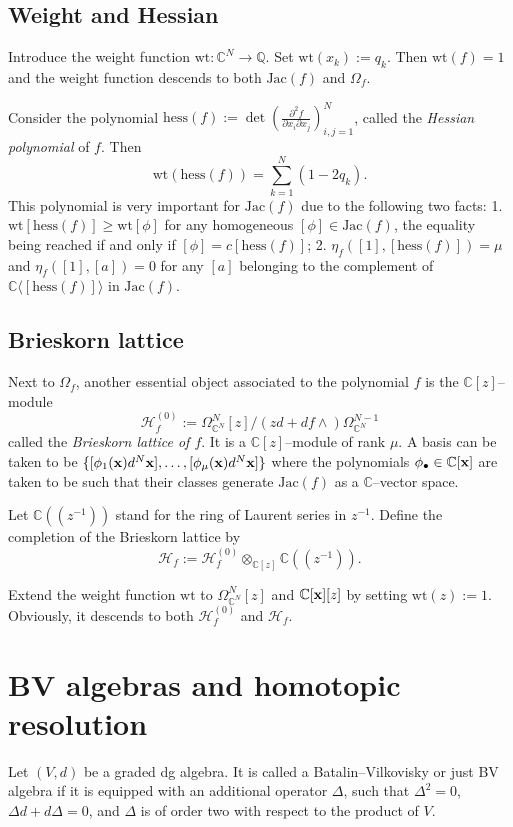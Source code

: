 \documentclass[12pt,a4paper]{amsart}
\newcommand{\CC}{{\mathbb{C}}}
\newcommand{\QQ}{{\mathbb{Q}}}
\newcommand{\Jac}{\mathrm{Jac}}
\newcommand{\bx}{{\bf x}}
\newcommand{\hess}{\mathrm{hess}}
\newcommand{\wt}{\mathrm{wt}}
\def\H{{\mathcal H}}
\newcommand{\p}{{\partial}}
\newcommand{\<}{\left<}
\renewcommand{\>}{\right>}
\newcommand{\ZZ}{\mathbb{Z}}
\numberwithin{equation}{section}
\begin{document}
\subsection{Weight and Hessian}\label{subsection: grading at the origin}
Introduce the weight function $\wt: \CC^N \to \QQ$. Set $\wt(x_k) := q_k$. Then $\wt(f) = 1$ and the weight function descends to both $\Jac(f)$ and $\Omega_f$.

Consider the polynomial $\hess(f) := \det \left( \frac{\p^2 f}{\p x_i \p x_j} \right)_{i,j=1}^N$, called the \textit{Hessian polynomial} of $f$. Then
\[
    \wt(\hess(f)) = \sum_{k=1}^N (1 - 2q_k).
\]
This polynomial is very important for $\Jac(f)$ due to the following two facts: 1. $\wt [\hess(f)] \ge \wt [\phi]$ for any homogeneous $[\phi] \in \Jac(f)$, the equality being reached if and only if $[\phi] = c [\hess(f)]$; 2. $\eta_f([1],[\hess(f)]) = \mu$ and $\eta_f([1], [a]) = 0$ for any $[a]$ belonging to the complement of $\CC \langle [\hess(f)] \rangle$ in $\Jac(f)$.

\subsection{Brieskorn lattice}
Next to $\Omega_f$, another essential object associated to the polynomial $f$ is the $\CC[z]$--module
\[
    \H^{(0)}_f := \Omega^N_{\CC^N}[z] / (zd + df\wedge ) \Omega^{N-1}_{\CC^N}
\]
called the \textit{Brieskorn lattice of $f$}. It is a $\CC[z]$--module of rank $\mu$. A basis can be taken to be $\lbrace [\phi_1(\bx) d^N \bx],\dots, [\phi_\mu(\bx) d^N \bx] \rbrace$ where the polynomials $\phi_\bullet \in \CC[\bx]$ are taken to be such that their classes generate $\Jac(f)$ as a $\CC$--vector space.

Let $\CC((z^{-1}))$ stand for the ring of Laurent series in $z^{-1}$. Define the completion of the Brieskorn lattice by
\[
    \H_f := \H^{(0)}_f \otimes_{\CC[z]} \CC((z^{-1})).
\]

Extend the weight function $\wt$ to $\Omega^N_{\CC^N}[z]$ and $\CC[\bx][z]$ by setting $\wt(z) := 1$. Obviously, it descends to both $\H_f^{(0)}$ and $\H_f$.

\section{BV algebras and homotopic resolution}
Let $(V,d)$  be a graded dg algebra. It is called a Batalin--Vilkovisky or just BV algebra if it is equipped with an additional operator $\Delta$, such that $\Delta^2 = 0$, $\Delta d + d \Delta = 0$, and $\Delta$ is of order two with respect to the product of $V$.
\end{document}
